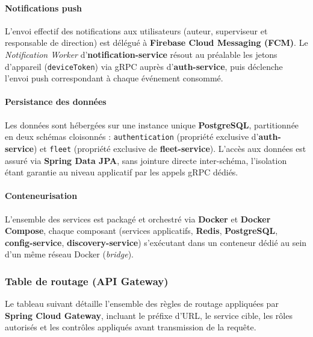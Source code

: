 \documentclass[11pt,a4paper]{article}
\begin{document}
\paragraph{Notifications push}
L'envoi effectif des notifications aux utilisateurs (auteur, superviseur et responsable de
direction) est délégué à \textbf{Firebase Cloud Messaging (FCM)}. Le \textit{Notification
Worker} d'\textbf{notification-service} résout au préalable les jetons d'appareil
(\texttt{deviceToken}) via gRPC auprès d'\textbf{auth-service}, puis déclenche l'envoi push
correspondant à chaque événement consommé.

\paragraph{Persistance des données}
Les données sont hébergées sur une instance unique \textbf{PostgreSQL}, partitionnée en deux
schémas cloisonnés : \texttt{authentication} (propriété exclusive d'\textbf{auth-service})
et \texttt{fleet} (propriété exclusive de \textbf{fleet-service}). L'accès aux données est
assuré via \textbf{Spring Data JPA}, sans jointure directe inter-schéma, l'isolation étant
garantie au niveau applicatif par les appels gRPC dédiés.

\paragraph{Conteneurisation}
L'ensemble des services est packagé et orchestré via \textbf{Docker} et \textbf{Docker
Compose}, chaque composant (services applicatifs, \textbf{Redis}, \textbf{PostgreSQL},
\textbf{config-service}, \textbf{discovery-service}) s'exécutant dans un conteneur dédié au
sein d'un même réseau Docker (\textit{bridge}).


\subsubsection{Table de routage (API Gateway)}

Le tableau suivant détaille l'ensemble des règles de routage appliquées par
\textbf{Spring Cloud Gateway}, incluant le préfixe d'URL, le service cible, les rôles
autorisés et les contrôles appliqués avant transmission de la requête.
\end{document}
